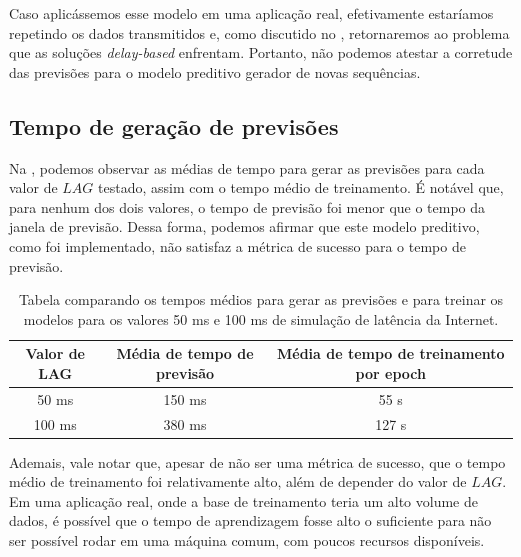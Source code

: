 Caso aplicássemos esse modelo em uma aplicação real, efetivamente estaríamos repetindo os dados transmitidos e, como discutido no , retornaremos ao problema que as soluções \textit{delay-based} enfrentam. Portanto, não podemos atestar a corretude das previsões para o modelo preditivo gerador de novas sequências.

\subsection{Tempo de geração de previsões}

Na , podemos observar as médias de tempo para gerar as previsões para cada valor de $LAG$ testado, assim com o tempo médio de treinamento. É notável que, para nenhum dos dois valores, o tempo de previsão foi menor que o tempo da janela de previsão. Dessa forma, podemos afirmar que este modelo preditivo, como foi implementado, não satisfaz a métrica de sucesso para o tempo de previsão.

\begin{table}[ht!]
    \centering
    \begin{tabular}{|c||c|c|}
        \hline
        
        Valor de LAG & Média de tempo de previsão & Média de tempo de treinamento por epoch \\
        
        \hline
        \hline
        
        50 ms & 150 ms & 55 s  \\ 
        \hline
        
        100 ms & 380 ms & 127 s \\ 
        \hline
    \end{tabular}
    \caption{Tabela comparando os tempos médios para gerar as previsões e para treinar os modelos para os valores 50 ms e 100 ms de simulação de latência da Internet.}
    \label{tab:lstm-time-results}
\end{table}

Ademais, vale notar que, apesar de não ser uma métrica de sucesso, que o tempo médio de treinamento foi relativamente alto, além de depender do valor de $LAG$. Em uma aplicação real, onde a base de treinamento teria um alto volume de dados, é possível que o tempo de aprendizagem fosse alto o suficiente para não ser possível rodar em uma máquina comum, com poucos recursos disponíveis.